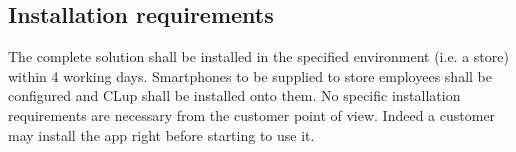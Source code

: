 \subsection{Installation requirements}
The complete solution shall be installed in the specified environment (i.e. a store) within 4 working days.\newline
Smartphones to be supplied to store employees shall be configured and CLup shall be installed onto them.\newline
No specific installation requirements are necessary from the customer point of view. Indeed a customer may install the app right before starting to use it.
